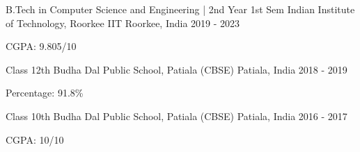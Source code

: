 

\begin{cventries}

  \cventry
    {B.Tech in Computer Science and Engineering | 2nd Year 1st Sem} %
    {Indian Institute of Technology, Roorkee} %
    {IIT Roorkee, India} %
    {2019 - 2023} %
    {
      \begin{cvitems} %
        \item {CGPA: 9.805/10}
      \end{cvitems}
    }

  \cventry
    {Class 12th} %
    {Budha Dal Public School, Patiala (CBSE)} %
    {Patiala, India} %
    {2018 - 2019} %
    {
      \begin{cvitems} %
        \item {Percentage: 91.8\%}
      \end{cvitems}
    }

  \cventry
    {Class 10th} %
    {Budha Dal Public School, Patiala (CBSE)} %
    {Patiala, India} %
    {2016 - 2017} %
    {
      \begin{cvitems} %
        \item {CGPA: 10/10}
      \end{cvitems}
    }

\end{cventries}